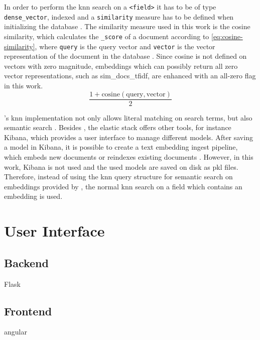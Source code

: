 In order to perform the \ac{knn} search on a \texttt{<field>} it has to be of type \texttt{dense\_vector}, indexed and a \texttt{similarity} measure has to be defined when initializing the database \cite{Elasticsearch-knn}.
The similarity measure used in this work is the cosine similarity, which calculates the \texttt{\_score} of a document according to \autoref{eq:cosine-similarity}, 
where \texttt{query} is the query vector and \texttt{vector} is the vector representation of the document in the database \cite{Elasticsearch-kNN-similarity}.
Since cosine is not defined on vectors with zero magnitude, embeddings which can possibly return all zero vector representations, such as sim\_docs\_tfidf, are enhanced with an all-zero flag in this work.
\begin{equation}
    \frac{1 + \text{cosine}(\text{query}, \text{vector})}{2}
\end{equation}
\label{eq:cosine-similarity}

\databaseName{}'s \ac{knn} implementation not only allows literal matching on search terms, but also semantic search \cite{Elasticsearch-knn}.
Besides \databaseName{}, the elastic stack offers other tools, for instance Kibana, which provides a user interface to manage different models.
After saving a model in Kibana, it is possible to create a text embedding ingest pipeline, which embeds new documents or reindexes existing documents \cite{Elasticsearch-knn-embedding}.
However, in this work, Kibana is not used and the used models are saved on disk as \ac{pkl} files.
Therefore, instead of using the \ac{knn} query structure for semantic search on embeddings provided by \databaseName{}, the normal \ac{knn} search on a field which contains an embedding is used.


\section{User Interface}\label{sec:ui}

\subsection{Backend}\label{subsec:backend}
Flask

\subsection{Frontend}\label{subsec:frontend}
angular